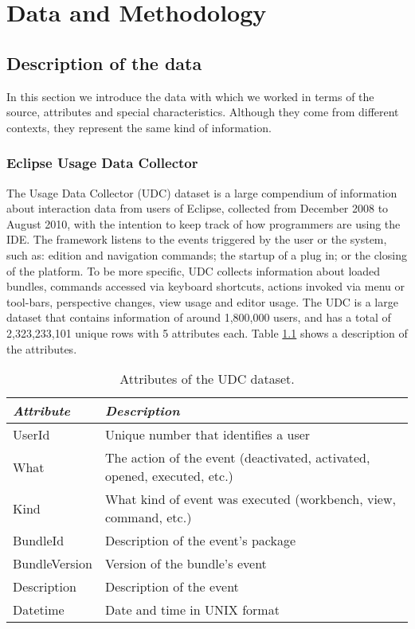 \chapter{Data and Methodology}
\label{ch:intro}

\section{Description of the data}
In this section we introduce the data with which we worked in terms of the source, attributes and special characteristics. Although they come from different contexts, they represent the same kind of information.

\subsection{Eclipse Usage Data Collector}
The Usage Data Collector (UDC) dataset is a large compendium of information about interaction data from users of Eclipse, collected from December 2008 to August 2010, with the intention to keep track of how programmers are using the IDE. The framework listens to the events triggered by the user or the system, such as: edition and navigation commands; the startup of a plug in; or the closing of the platform. To be more specific, UDC collects information about loaded bundles, commands accessed via keyboard shortcuts, actions invoked via menu or tool-bars, perspective changes, view usage and editor usage. The UDC is a large dataset that contains information of around 1,800,000 users, and has a total of 2,323,233,101 unique rows with 5 attributes each. Table \ref{tbl:att_udc} shows a description of the attributes.


\begin{table}[ht!]
	\small
	\caption{Attributes of the UDC dataset. }
	\label{tbl:att_udc}
	\centering
	\begin{tabular}{p{2.5cm}|p{7cm}} 
		\hline 
		\emph{Attribute} & \emph{Description} \\  
		\hline 
		\hline 
		UserId &  Unique number that identifies a user \\
		\hline
		What & The action of the event (deactivated, activated, opened, executed, etc.)  \\
		\hline
		Kind & What kind of event was executed (workbench, view, command, etc.)  \\
		\hline
		BundleId & Description of the event's package  \\
		\hline
		BundleVersion & Version of the bundle's event  \\
		\hline
		Description & Description of the event\\
		\hline
		Datetime & Date and time in UNIX format\\
		\hline
	\end{tabular}
	
\end{table}

